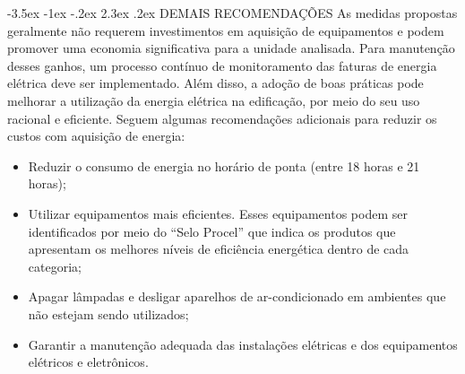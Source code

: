 \documentclass[a4paper,12pt]{abntex2}
\makeatletter
\renewcommand\chapter{\@startsection{chapter}{0}{\z@}%
  {-3.5ex \@plus -1ex \@minus -.2ex}%
  {2.3ex \@plus.2ex}%
  {\normalfont\large\bfseries}}
\makeatother
\begin{document}
\chapter{DEMAIS RECOMENDAÇÕES}
As  medidas  propostas  geralmente  não  requerem  investimentos  em  aquisição  de 
equipamentos e podem promover uma economia significativa para a unidade analisada. 
Para manutenção desses ganhos, um processo contínuo de monitoramento das faturas de 
energia elétrica deve ser implementado. 
Além  disso, a adoção de boas práticas pode melhorar a utilização da energia elétrica na 
edificação,  por meio  do  seu  uso  racional  e  eficiente.  Seguem  algumas  recomendações 
adicionais para reduzir os custos com aquisição de energia:
\begin{itemize}
    \item  Reduzir o consumo de energia no horário de ponta (entre 18 horas e 21 horas);
    \item  Utilizar equipamentos mais eficientes. Esses equipamentos podem ser identificados 
    por meio do “Selo Procel” que indica os produtos que apresentam os melhores níveis de 
    eficiência energética dentro de cada categoria;
    \item   Apagar lâmpadas e desligar aparelhos de ar-condicionado em ambientes que não 
    estejam sendo utilizados;
    \item  Garantir  a  manutenção  adequada  das  instalações  elétricas  e  dos  equipamentos 
    elétricos e eletrônicos. 
\end{itemize}
\end{document}
